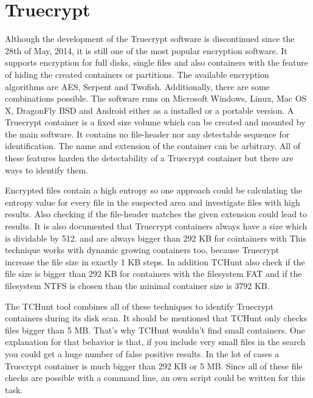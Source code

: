\section{Truecrypt}
Although the development of the Truecrypt software is discontinued since the 28th of May, 2014, it is still one of the most popular encryption software.
It supports encryption for full disks, single files and also containers with the feature of hiding the created containers or partitions.
The available encryption algorithms are AES, Serpent and Twofish. Additionally, there are some combinations possible.
The software runs on Microsoft Windows, Linux, Mac OS X, DragonFly BSD and Android either as a installed or a portable version.\cite{wiki:truecrypt}
A Truecrypt container is a fixed size volume which can be created and mounted by the main software.
It contains no file-header nor any detectable sequence for identification.
The name and extension of the container can be arbitrary.
All of these features harden the detectability of a Truecrypt container but there are ways to identify them.

Encrypted files contain a high entropy so one approach could be calculating the entropy value for every file in the suspected area and investigate files with high results.
Also checking if the file-header matches the given extension could lead to results.
It is also documented that Truecrypt containers always have a size which is dividable by 512.
and are always bigger than 292 KB for cointainers with
This technique works with dynamic growing containers too, because Truecrypt increase the file size in exactly 1 KB steps. In addition TCHunt also check if the file size is bigger than 292 KB for containers with the filesystem FAT and if the filesystem NTFS is chosen than the minimal container size is 3792 KB.
\cite{truecrypt:sourceCode}

The TCHunt tool combines all of these techniques to identify Truecrypt containers during its disk scan. It should be mentioned that TCHunt only checks files bigger than 5 MB.
That's why TCHunt wouldn't find small containers. One explanation for that behavior is that, if you include very small files in the search you could get a huge number of false positive results. In the lot of cases a Truecrypt container is much bigger than 292 KB or 5 MB. 
Since all of these file checks are possible with a command line, an own script could be written for this task.
